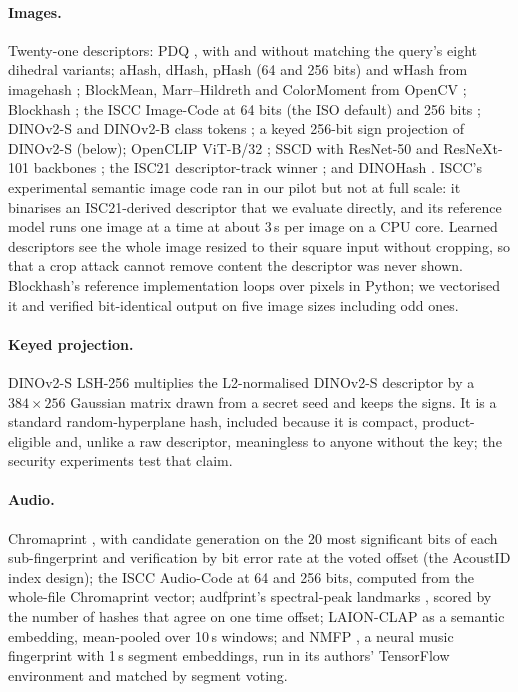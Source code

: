 \paragraph{Images.} Twenty-one descriptors: PDQ \cite{meta2019pdq}, with and without matching the query's eight dihedral variants; aHash, dHash, pHash (64 and 256 bits) and wHash from imagehash \cite{buchner_imagehash}; BlockMean, Marr--Hildreth and ColorMoment from OpenCV \cite{opencv_imghash}; Blockhash \cite{commonsmachinery_blockhash}; the ISCC Image-Code at 64 bits (the ISO default) and 256 bits \cite{iso24138}; DINOv2-S and DINOv2-B class tokens \cite{oquab2024dinov2}; a keyed 256-bit sign projection of DINOv2-S (below); OpenCLIP ViT-B/32 \cite{cherti2023openclip}; SSCD with ResNet-50 and ResNeXt-101 backbones \cite{pizzi2022sscd}; the ISC21 descriptor-track winner \cite{yokoo2021isc}; and DINOHash \cite{singhi2025dinohash}. ISCC's experimental semantic image code \cite{iscc_sci} ran in our pilot but not at full scale: it binarises an ISC21-derived descriptor that we evaluate directly, and its reference model runs one image at a time at about 3\,s per image on a CPU core. Learned descriptors see the whole image resized to their square input without cropping, so that a crop attack cannot remove content the descriptor was never shown. Blockhash's reference implementation loops over pixels in Python; we vectorised it and verified bit-identical output on five image sizes including odd ones.

\paragraph{Keyed projection.} DINOv2-S LSH-256 multiplies the L2-normalised DINOv2-S descriptor by a $384 \times 256$ Gaussian matrix drawn from a secret seed and keeps the signs. It is a standard random-hyperplane hash, included because it is compact, product-eligible and, unlike a raw descriptor, meaningless to anyone without the key; the security experiments test that claim.

\paragraph{Audio.} Chromaprint \cite{lalinsky_chromaprint}, with candidate generation on the 20 most significant bits of each sub-fingerprint and verification by bit error rate at the voted offset (the AcoustID index design); the ISCC Audio-Code at 64 and 256 bits, computed from the whole-file Chromaprint vector; audfprint's spectral-peak landmarks \cite{ellis_audfprint}, scored by the number of hashes that agree on one time offset; LAION-CLAP \cite{wu2023clap} as a semantic embedding, mean-pooled over 10\,s windows; and NMFP \cite{araz2025nmfp}, a neural music fingerprint with 1\,s segment embeddings, run in its authors' TensorFlow environment and matched by segment voting.

